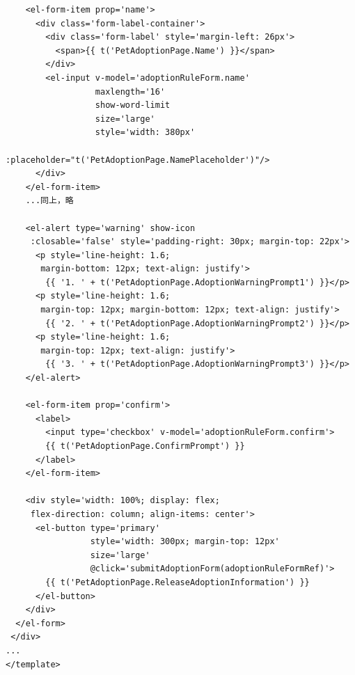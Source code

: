 \begin{itemize}
\begin{verbatim}
    <el-form-item prop='name'>
      <div class='form-label-container'>
        <div class='form-label' style='margin-left: 26px'>
          <span>{{ t('PetAdoptionPage.Name') }}</span>
        </div>
        <el-input v-model='adoptionRuleForm.name'
                  maxlength='16'
                  show-word-limit
                  size='large'
                  style='width: 380px'
                  :placeholder="t('PetAdoptionPage.NamePlaceholder')"/>
      </div>
    </el-form-item>
    ...同上，略

    <el-alert type='warning' show-icon
     :closable='false' style='padding-right: 30px; margin-top: 22px'>
      <p style='line-height: 1.6;
       margin-bottom: 12px; text-align: justify'>
        {{ '1. ' + t('PetAdoptionPage.AdoptionWarningPrompt1') }}</p>
      <p style='line-height: 1.6;
       margin-top: 12px; margin-bottom: 12px; text-align: justify'>
        {{ '2. ' + t('PetAdoptionPage.AdoptionWarningPrompt2') }}</p>
      <p style='line-height: 1.6;
       margin-top: 12px; text-align: justify'>
        {{ '3. ' + t('PetAdoptionPage.AdoptionWarningPrompt3') }}</p>
    </el-alert>
	
    <el-form-item prop='confirm'>
      <label>
        <input type='checkbox' v-model='adoptionRuleForm.confirm'>
        {{ t('PetAdoptionPage.ConfirmPrompt') }}
      </label>
    </el-form-item>
	
    <div style='width: 100%; display: flex;
     flex-direction: column; align-items: center'>
      <el-button type='primary'
                 style='width: 300px; margin-top: 12px'
                 size='large'
                 @click='submitAdoptionForm(adoptionRuleFormRef)'>
        {{ t('PetAdoptionPage.ReleaseAdoptionInformation') }}
      </el-button>
    </div>
  </el-form>
 </div>
...
</template>
	\end{verbatim}
	

\end{itemize}
